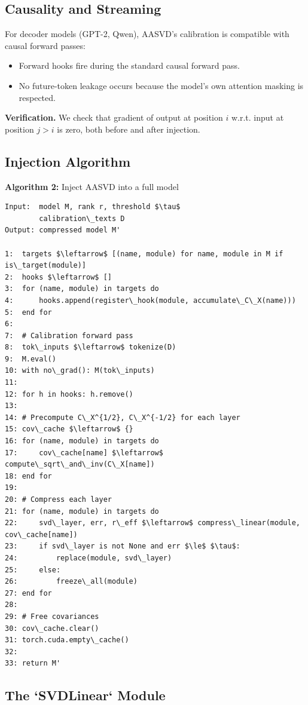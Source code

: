 \subsection{Causality and Streaming}

For decoder models (GPT-2, Qwen), AASVD's calibration is compatible with 
causal forward passes:

\begin{itemize}
\item Forward hooks fire during the standard causal forward pass.
\item No future-token leakage occurs because the model's own attention
  masking is respected.

\end{itemize}
\textbf{Verification.} We check that gradient of output at position $i$ w.r.t. 
input at position $j > i$ is zero, both before and after injection.

\subsection{Injection Algorithm}

\textbf{Algorithm 2:} Inject AASVD into a full model
\begin{lstlisting}
Input:  model M, rank r, threshold $\tau$
        calibration\_texts D
Output: compressed model M'

1:  targets $\leftarrow$ [(name, module) for name, module in M if is\_target(module)]
2:  hooks $\leftarrow$ []
3:  for (name, module) in targets do
4:      hooks.append(register\_hook(module, accumulate\_C\_X(name)))
5:  end for
6:
7:  # Calibration forward pass
8:  tok\_inputs $\leftarrow$ tokenize(D)
9:  M.eval()
10: with no\_grad(): M(tok\_inputs)
11:
12: for h in hooks: h.remove()
13:
14: # Precompute C\_X^{1/2}, C\_X^{-1/2} for each layer
15: cov\_cache $\leftarrow$ {}
16: for (name, module) in targets do
17:     cov\_cache[name] $\leftarrow$ compute\_sqrt\_and\_inv(C\_X[name])
18: end for
19:
20: # Compress each layer
21: for (name, module) in targets do
22:     svd\_layer, err, r\_eff $\leftarrow$ compress\_linear(module, cov\_cache[name])
23:     if svd\_layer is not None and err $\le$ $\tau$:
24:         replace(module, svd\_layer)
25:     else:
26:         freeze\_all(module)
27: end for
28:
29: # Free covariances
30: cov\_cache.clear()
31: torch.cuda.empty\_cache()
32:
33: return M'
\end{lstlisting}

\subsection{The `SVDLinear` Module}

